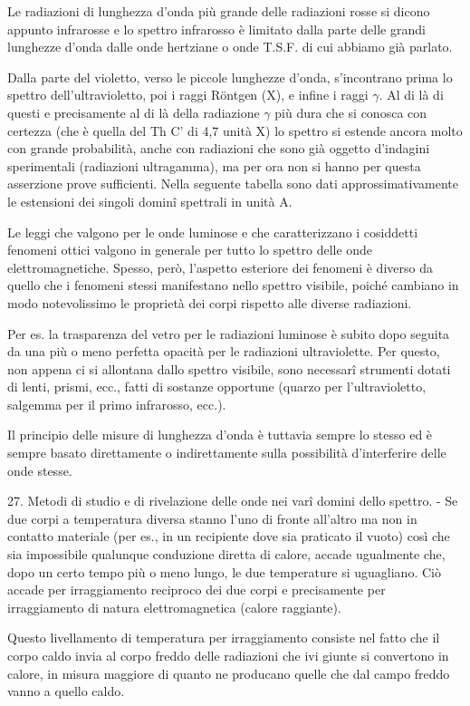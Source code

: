 \documentclass[a4paper]{article}
\begin{document}
Le radiazioni di lunghezza d'onda più grande delle radiazioni rosse si dicono appunto infrarosse e lo spettro infrarosso è limitato dalla parte delle grandi lunghezze d'onda dalle onde hertziane o onde T.S.F. di cui abbiamo già parlato.

Dalla parte del violetto, verso le piccole lunghezze d'onda, s'incontrano prima lo spettro dell'ultravioletto, poi i raggi Röntgen (X), e infine i raggi $\gamma$. Al di là di questi e precisamente al di là della radiazione $\gamma$ più dura che si conosca con certezza (che è quella del Th C' di 4,7 unità X) lo spettro si estende ancora molto con grande probabilità, anche con radiazioni che sono già oggetto d'indagini sperimentali (radiazioni ultragamma), ma per ora non si hanno per questa asserzione prove sufficienti. Nella seguente tabella sono dati approssimativamente le estensioni dei singoli dominî spettrali in unità A.

Le leggi che valgono per le onde luminose e che caratterizzano i cosiddetti fenomeni ottici valgono in generale per tutto lo spettro delle onde elettromagnetiche. Spesso, però, l'aspetto esteriore dei fenomeni è diverso da quello che i fenomeni stessi manifestano nello spettro visibile, poiché cambiano in modo notevolissimo le proprietà dei corpi rispetto alle diverse radiazioni.

Per es. la trasparenza del vetro per le radiazioni luminose è subito dopo seguita da una più o meno perfetta opacità per le radiazioni ultraviolette. Per questo, non appena ci si allontana dallo spettro visibile, sono necessarî strumenti dotati di lenti, prismi, ecc., fatti di sostanze opportune (quarzo per l'ultravioletto, salgemma per il primo infrarosso, ecc.).

Il principio delle misure di lunghezza d'onda è tuttavia sempre lo stesso ed è sempre basato direttamente o indirettamente sulla possibilità d'interferire delle onde stesse.

27. Metodi di studio e di rivelazione delle onde nei varî domini dello spettro. - Se due corpi a temperatura diversa stanno l'uno di fronte all'altro ma non in contatto materiale (per es., in un recipiente dove sia praticato il vuoto) così che sia impossibile qualunque conduzione diretta di calore, accade ugualmente che, dopo un certo tempo più o meno lungo, le due temperature si uguagliano. Ciò accade per irraggiamento reciproco dei due corpi e precisamente per irraggiamento di natura elettromagnetica (calore raggiante).

Questo livellamento di temperatura per irraggiamento consiste nel fatto che il corpo caldo invia al corpo freddo delle radiazioni che ivi giunte si convertono in calore, in misura maggiore di quanto ne producano quelle che dal campo freddo vanno a quello caldo.
\end{document}
